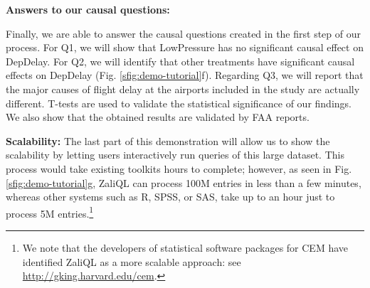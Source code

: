 {\bf Answers to our causal questions:}
Finally, we are able to answer the causal questions created in the first step of our process. For Q1, we will show that LowPressure has no significant causal effect on DepDelay. For Q2, we will identify that other treatments have significant causal effects on DepDelay (Fig. \ref{sfig:demo-tutorial}f). Regarding Q3, we will report that the major causes of flight delay at the airports included in the study are actually different. T-tests are used to validate the statistical significance of our findings. We also show that the obtained results are validated by FAA reports. 

{\bf Scalability:} The last part of this demonstration will allow us to show the scalability by letting users interactively run queries of this large dataset. This process would take existing toolkits hours to complete; however, as seen in Fig. \ref{sfig:demo-tutorial}g, ZaliQL can process 100M entries in less than a few minutes, whereas other systems such as R, SPSS, or SAS, take up to an hour just to process 5M entries.\footnote{We note that the developers of statistical software packages for CEM have identified ZaliQL as a more scalable approach: see \url{http://gking.harvard.edu/cem}.}



